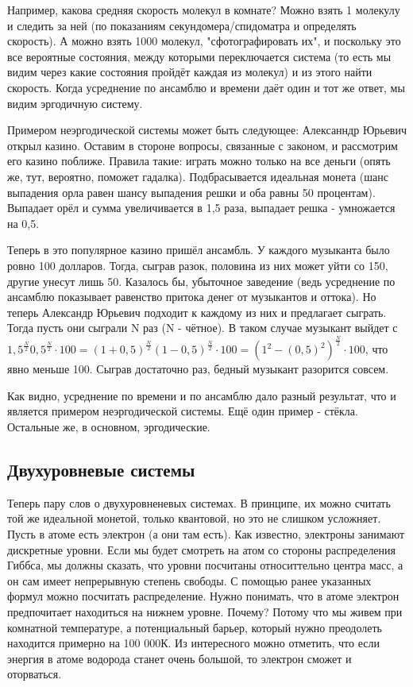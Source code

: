 \documentclass[a4paper, 12pt]{article}
\begin{document}
	Например, какова средняя скорость молекул в комнате? Можно взять 1 молекулу и следить за ней (по показаниям секундомера/спидоматра и определять скорость). А можно взять 1000 молекул, "сфотографировать их", и поскольку это все вероятные состояния, между которыми переключается система (то есть мы видим через какие состояния пройдёт каждая из молекул) и из этого найти скорость. Когда усреднение по ансамблю и времени даёт один и тот же ответ, мы видим эргодичную систему. 
	
	Примером неэргодической системы может быть следующее:
	Алексанндр Юрьевич открыл казино. Оставим в стороне вопросы, связанные с законом, и рассмотрим его казино поближе. Правила такие: играть можно только на все деньги (опять же, тут, вероятно, поможет гадалка). Подбрасывается идеальная монета (шанс выпадения орла равен шансу выпадения решки и оба равны 50 процентам). Выпадает орёл и сумма увеличивается в 1,5 раза, выпадает решка - умножается на 0,5.
	
	Теперь в это популярное казино пришёл ансамбль. У каждого музыканта было ровно 100 долларов. Тогда, сыграв разок, половина из них может уйти со 150, другие унесут лишь 50. Казалось бы, убыточное заведение (ведь усреднение по ансамблю показывает равенство притока денег от музыкантов и оттока). Но теперь Александр Юрьевич подходит к каждому из них и предлагает сыграть. Тогда пусть они сыграли N раз (N - чётное). В таком случае музыкант выйдет с $1,5^{\frac{N}{2}} 0,5^{\frac{N}{2}} \cdot 100 = (1+0,5)^{\frac{N}{2}} (1-0,5)^{\frac{N}{2}} \cdot 100= (1^{2}-(0,5)^{2})^{\frac{N}{2}} \cdot 100$, что явно меньше 100. Сыграв достаточно раз, бедный музыкант разорится совсем. 
	
	Как видно, усреднение по времени и по ансамблю дало разный результат, что и является примером неэргодической системы. Ещё один пример - стёкла. Остальные же, в основном, эргодические. 
	\subsection{Двухуровневые системы}
	Теперь пару слов о двухуровненевых системах. В принципе, их можно считать той же идеальной монетой, только квантовой, но это не слишком усложняет. Пусть в атоме есть электрон (а они там есть). Как известно, электроны занимают дискретные уровни. Если мы будет смотреть на атом со стороны распределения Гиббса, мы должны сказать, что уровни посчитаны относиттельно центра масс, а он сам имеет непрерывную степень свободы. С помощью ранее указанных формул можно посчитать распределение. Нужно понимать, что в атоме электрон предпочитает находиться на нижнем уровне. Почему? Потому что мы живем при комнатной температуре, а потенциальный барьер, который нужно преодолеть находится примерно на 100 000К. Из интересного можно отметить, что если энергия в атоме водорода станет очень большой, то электрон сможет и оторваться. 
	
\end{document}

